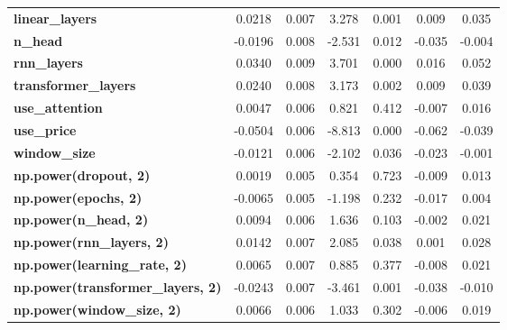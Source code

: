 \begin{center}
\begin{tabular}{lcccccc}
\textbf{linear\_layers}                   &       0.0218  &        0.007     &     3.278  &         0.001        &        0.009    &        0.035     \\
\textbf{n\_head}                          &      -0.0196  &        0.008     &    -2.531  &         0.012        &       -0.035    &       -0.004     \\
\textbf{rnn\_layers}                      &       0.0340  &        0.009     &     3.701  &         0.000        &        0.016    &        0.052     \\
\textbf{transformer\_layers}              &       0.0240  &        0.008     &     3.173  &         0.002        &        0.009    &        0.039     \\
\textbf{use\_attention}                   &       0.0047  &        0.006     &     0.821  &         0.412        &       -0.007    &        0.016     \\
\textbf{use\_price}                       &      -0.0504  &        0.006     &    -8.813  &         0.000        &       -0.062    &       -0.039     \\
\textbf{window\_size}                     &      -0.0121  &        0.006     &    -2.102  &         0.036        &       -0.023    &       -0.001     \\
\textbf{np.power(dropout, 2)}             &       0.0019  &        0.005     &     0.354  &         0.723        &       -0.009    &        0.013     \\
\textbf{np.power(epochs, 2)}              &      -0.0065  &        0.005     &    -1.198  &         0.232        &       -0.017    &        0.004     \\
\textbf{np.power(n\_head, 2)}             &       0.0094  &        0.006     &     1.636  &         0.103        &       -0.002    &        0.021     \\
\textbf{np.power(rnn\_layers, 2)}         &       0.0142  &        0.007     &     2.085  &         0.038        &        0.001    &        0.028     \\
\textbf{np.power(learning\_rate, 2)}      &       0.0065  &        0.007     &     0.885  &         0.377        &       -0.008    &        0.021     \\
\textbf{np.power(transformer\_layers, 2)} &      -0.0243  &        0.007     &    -3.461  &         0.001        &       -0.038    &       -0.010     \\
\textbf{np.power(window\_size, 2)}        &       0.0066  &        0.006     &     1.033  &         0.302        &       -0.006    &        0.019     \\

\end{tabular}
\end{center}
